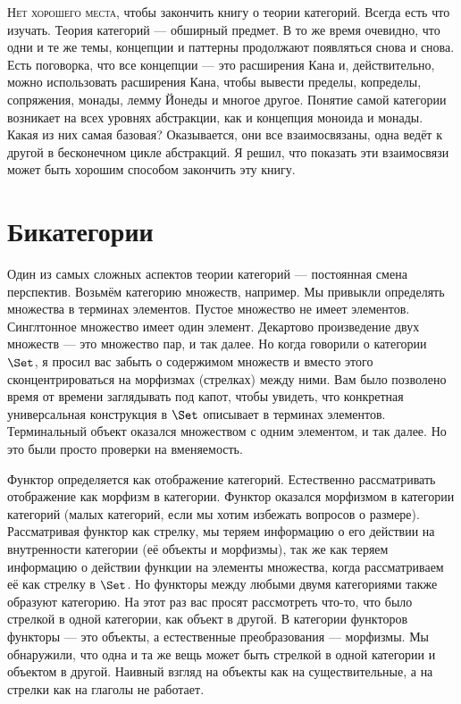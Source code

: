 
\lettrine[lhang=0.17]{Н}{ет хорошего места}, чтобы закончить книгу о теории категорий. Всегда есть
что изучать. Теория категорий — обширный предмет. В то же время очевидно,
что одни и те же темы, концепции и паттерны продолжают появляться
снова и снова. Есть поговорка, что все концепции — это расширения Кана
и, действительно, можно использовать расширения Кана, чтобы вывести пределы,
копределы, сопряжения, монады, лемму Йонеды и многое другое.
Понятие самой категории возникает на всех уровнях абстракции, как и
концепция моноида и монады. Какая из них самая базовая?
Оказывается, они все взаимосвязаны, одна ведёт к другой в
бесконечном цикле абстракций. Я решил, что показать эти
взаимосвязи может быть хорошим способом закончить эту книгу.

\section{Бикатегории}

Один из самых сложных аспектов теории категорий — постоянная
смена перспектив. Возьмём категорию множеств, например. Мы
привыкли определять множества в терминах элементов. Пустое множество не имеет
элементов. Синглтонное множество имеет один элемент. Декартово произведение двух
множеств — это множество пар, и так далее. Но когда говорили о категории
$\Set$, я просил вас забыть о содержимом множеств и
вместо этого сконцентрироваться на морфизмах (стрелках) между ними. Вам было
позволено время от времени заглядывать под капот, чтобы увидеть, что
конкретная универсальная конструкция в $\Set$ описывает в терминах
элементов. Терминальный объект оказался множеством с одним элементом,
и так далее. Но это были просто проверки на вменяемость.

Функтор определяется как отображение категорий. Естественно
рассматривать отображение как морфизм в категории. Функтор оказался
морфизмом в категории категорий (малых категорий, если мы
хотим избежать вопросов о размере). Рассматривая функтор как стрелку,
мы теряем информацию о его действии на внутренности
категории (её объекты и морфизмы), так же как теряем
информацию о действии функции на элементы множества, когда
рассматриваем её как стрелку в $\Set$. Но функторы между любыми двумя
категориями также образуют категорию. На этот раз вас просят рассмотреть
что-то, что было стрелкой в одной категории, как объект в другой.
В категории функторов функторы — это объекты, а естественные преобразования —
морфизмы. Мы обнаружили, что одна и та же вещь может быть стрелкой в
одной категории и объектом в другой. Наивный взгляд на объекты как на
существительные, а на стрелки как на глаголы не работает.

